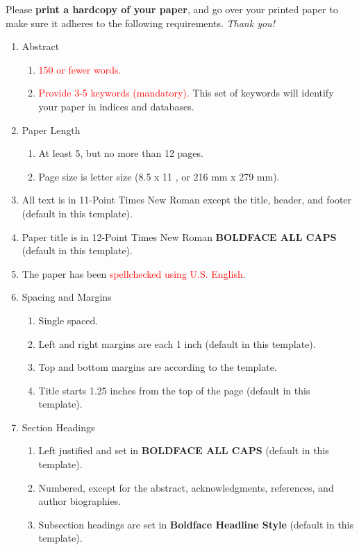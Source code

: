 \documentclass{article}
\begin{document}
Please \textbf{print a hardcopy of your paper}, and go over your printed paper to make sure it adheres to the following requirements. \textit{Thank you!}

\begin{enumerate}
	\item Abstract
  \begin{enumerate}
	  \item \textcolor{red}{150 or fewer words.}
	  \item \textcolor{red}{Provide 3-5 keywords (mandatory).} This set of keywords will identify your paper in indices and databases.
	\end{enumerate}
	\item Paper Length
  \begin{enumerate}
	  \item At least 5, but no more than 12 pages.
	  \item Page size is letter size (8.5  x 11 , or 216 mm x 279 mm).
	\end{enumerate}
	\item All text is in 11-Point Times New Roman except the title, header, and footer (default in this template).
	\item Paper title is in 12-Point Times New Roman \textbf{BOLDFACE ALL CAPS} (default in this template).
	\item The paper has been \textcolor{red}{spellchecked using U.S. English}. 
	\item Spacing and Margins
  \begin{enumerate}
	  \item Single spaced.
	  \item Left and right margins are each 1 inch (default in this template).
	  \item Top and bottom margins are according to the template.
	  \item Title starts 1.25 inches from the top of the page (default in this template).
	\end{enumerate}
	\item Section Headings
  \begin{enumerate}
	  \item Left justified and set in \textbf{BOLDFACE ALL CAPS} (default in this template).
	  \item Numbered, except for the abstract, acknowledgments, references, and author biographies.
	  \item Subsection headings are set in \textbf{Boldface Headline Style} (default in this template).
	\end{enumerate}

\end{enumerate}
\end{document}
